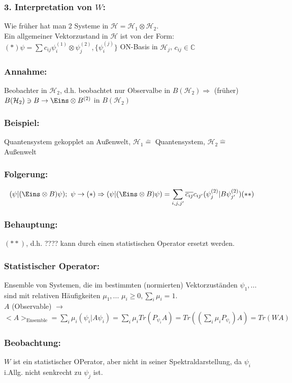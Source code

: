 \documentclass[twoside,a4paper]{scrartcl}
\newcommand{\C}{\mathbb{C}}
\renewcommand{\1}{\mathds{1}}
\newcommand{\Ra}{\Rightarrow}
\newcommand{\ra}{\rightarrow}
\renewcommand{\H}{\mathcal{H}}
\renewcommand{\C}{\mathbb{C}}
\begin{document}
\subsubsection*{3. Interpretation von $W$:}
Wie früher hat man 2 Systeme in $\H=\H_1\otimes \H_2$.\\
Ein allgemeiner Vektorzustand in $\H$ ist von der Form: $(*) \psi=\sum c_{ij} \psi_i^{(1)} \otimes \psi_j^{(2)}, \{\psi_i^{(j)}\}$ ON-Basis in $\H_j$, $c_{ij} \in \C$
\subsubsection*{Annahme:}
Beobachter in $\H_2$, d.h. beobachtet nur Observalbe in $B(\H_2) \Ra$ (früher) $B(\H_2) \ni B \ra \Eins \otimes B^{(2)}$ in $B(\H_2)$
\subsubsection*{Beispiel:}
Quantensystem gekopplet an Außenwelt, $\H_1 \mathrel{\widehat{=}}$ Quantensystem, $\H_2\mathrel{\widehat{=}}$ Außenwelt
\subsubsection*{Folgerung:}
$$(\psi|(\Eins\otimes B)\psi); \ \psi \ra (*) \Ra (\psi|(\Eins\otimes B)\psi)=\sum_{i,j,j'} \overline{c_{ij}}c_{ij'}(\psi_j^{(2)}|B \psi_{j'}^{(2)}) (**)$$
\subsubsection*{Behauptung:} 
$(**)$, d.h. ???? kann durch einen statistischen Operator ersetzt werden.
\subsubsection*{Statistischer Operator:} 
Ensemble von Systemen, die im bestimmten (normierten) Vektorzuständen $\psi_1,...$ sind mit relativen Häufigkeiten $\mu_1,...$ $\mu_i\geq 0, \sum_i \mu_i=1$.\\
$A$ (Observable) $\ra$ $<A>_{\mathrm{Ensemble}}=\sum_i \mu_i (\psi_i|A\psi_i)=\sum_i \mu_i Tr(P_{\psi_i}A)=Tr((\sum_i \mu_i P_{\psi_i})A)=Tr(WA)$
\subsubsection*{Beobachtung:} 
$W$ ist ein statistischer OPerator, aber nicht in seiner Spektraldarstellung, da $\psi_i$ i.Allg. nicht senkrecht zu $\psi_j$ ist.
\end{document}
